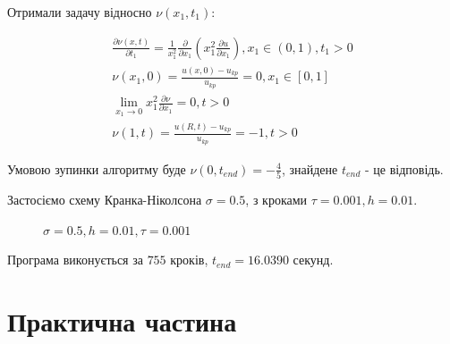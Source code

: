 \documentclass[14pt,a4paper]{scrartcl}
\begin{document}
Отримали задачу відносно $\nu(x_1, t_1)$:

\begin{gather}
	\frac{\partial \nu(x,t)}{\partial t_{1}} =  \frac{1}{x^{2}_1} \frac{\partial}{\partial x_{1}}\left( x_{1}^{2} \frac{\partial u}{\partial x_1}\right), x_1 \in (0,1), t_1 >0 \label{eq21} \\
	\nu(x_1, 0) = \frac{u(x,0) - u_{kp}}{u_{kp}} = 0 , x_{1} \in [0,1] \label{eq22} \\
	\lim_{x_1 \to 0} x_{1}^{2} \frac{\partial \nu}{\partial x_1} = 0 , t>0 \label{eq23} \\
	\nu(1,t) = \frac{u(R,t) - u_{kp}}{u_{kp}} = -1 , t>0 \label{eq24}
\end{gather}

Умовою зупинки алгоритму буде $\nu(0,t_{end}) = -\frac{4}{5}$, знайдене $t_{end}$ - це відповідь.

Застосіємо схему Кранка-Ніколсона $\sigma = 0.5$, з кроками $\tau = 0.001, h = 0.01$.

\begin{figure}[h!]
	\caption{$ \sigma = 0.5, h = 0.01, \tau = 0.001$}
	\label{fig:image}
\end{figure}\newpage

Програма виконується за $755$ кроків, $t_{end} = 16.0390$ секунд.


\newpage
\section{Практична частина}
\end{document}
